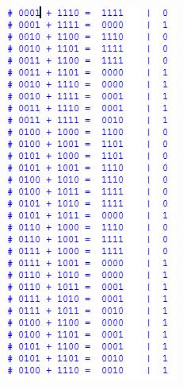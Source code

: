 \begin{figure}[H]
\begin{subfigure}[b]{0.44\textwidth}
			\label{fig:etapa3-3}
		\end{subfigure}
		~
		\begin{subfigure}[b]{0.44\textwidth}
			\includegraphics[width=\textwidth]{img/etapa3/simulacaoSomadorCompleto4Bits_4}
			\label{fig:etapa3-4}


\end{subfigure}
\end{figure}
